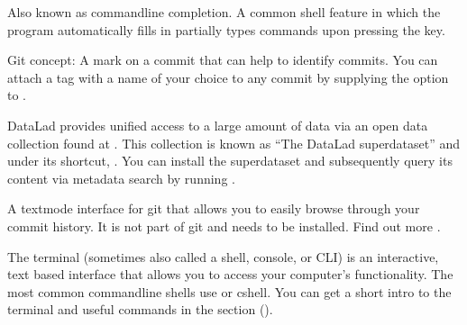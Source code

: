 \begin{description}
\ignorespaces 
\sphinxAtStartPar
Also known as command\sphinxhyphen{}line completion. A common shell feature in which
the program automatically fills in partially types commands upon
pressing the  key.

\ignorespaces 
\sphinxAtStartPar
Git concept: A mark on a commit that can help to identify commits. You can attach
a tag with a name of your choice to any commit by supplying the 
option to .

\sphinxAtStartPar
DataLad provides unified access to a large amount of data via an open data
collection found at .
This collection is known as “The DataLad superdataset” and under its shortcut,
\sphinxcode{\sphinxupquote{///}}. You can install the superdataset \textendash{} and subsequently query its content via metadata
search \textendash{} by running .

\ignorespaces 
\sphinxAtStartPar
A text\sphinxhyphen{}mode interface for git that allows you to easily browse through your commit history.
It is not part of git and needs to be installed. Find out more .

\sphinxAtStartPar
The terminal (sometimes also called a shell, console, or CLI) is an interactive, text based interface that allows you to access your computer’s functionality.
The most common command\sphinxhyphen{}line shells use {\hyperref[\detokenize{glossary:term-bash}]{}} or c\sphinxhyphen{}shell.
You can get a short intro to the terminal and useful commands in the section {\hyperref[\detokenize{intro/howto:howto}]{}} ().


\end{description}
